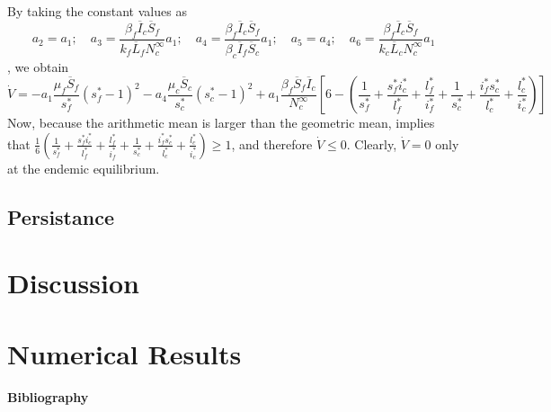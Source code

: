 \documentclass[preprint,12pt]{elsarticle}
\begin{document}
\noindent By taking the constant values as
$$a_2=a_1;\quad a_3=\frac{\beta_f\overline{I}_c\overline{S}_f}{k_f\overline{L}_f N_c^{\infty}}a_1;\quad a_4=\frac{\beta_f\overline{I}_c\overline{S}_f}{\beta_c\overline{I}_f\overline{S}_c}a_1;\quad a_5=a_4;\quad a_6=\frac{\beta_f\overline{I}_c\overline{S}_f}{k_c\overline{L}_c N_c^{\infty}}a_1 $$,
we obtain
$$\dot{V}= -a_1\frac{\mu_f\overline{S}_f}{s_f^*}\left(s_f^*-1\right)^2-a_4\frac{\mu_c\overline{S}_c}{s_c^*}\left(s_c^*-1\right)^2+a_1\frac{\beta_f\overline{S}_f\overline{I}_c}{N_c^{\infty}}\left[6-\left(\frac{1}{s_f^*}+\frac{s_f^*i_c^*}{l_f^*}+\frac{l_f^*}{i_f^*}+\frac{1}{s_c^*}+\frac{i_f^*s_c^*}{l_c^*}+\frac{l_c^*}{i_c^*}\right)\right]$$
Now, because the arithmetic mean is larger than the geometric mean, implies that  $\frac{1}{6}\left(\frac{1}{s_f^*}+\frac{s_f^*i_c^*}{l_f^*}+\frac{l_f^*}{i_f^*}+\frac{1}{s_c^*}+\frac{i_f^*s_c^*}{l_c^*}+\frac{l_c^*}{i_c^*}\right)\geq 1$, and therefore $\dot{V}\leq 0$. Clearly, $\dot{V} = 0$ only at the endemic equilibrium.


\subsection{Persistance}

\section{Discussion}

\section{Numerical Results}

    

\textbf{Bibliography}


\end{document}
